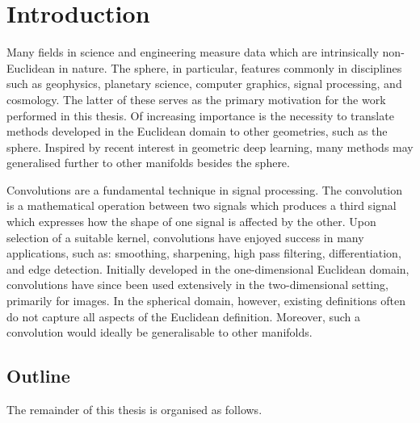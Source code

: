 \chapter{Introduction}\label{sec:chapter1}

Many fields in science and engineering measure data which are intrinsically non-Euclidean in nature.
The sphere, in particular, features commonly in disciplines such as geophysics, planetary science, computer graphics, signal processing, and cosmology.
The latter of these serves as the primary motivation for the work performed in this thesis.
Of increasing importance is the necessity to translate methods developed in the Euclidean domain to other geometries, such as the sphere.
Inspired by recent interest in geometric deep learning, many methods may generalised further to other manifolds besides the sphere.

Convolutions are a fundamental technique in signal processing.
The convolution is a mathematical operation between two signals which produces a third signal which expresses how the shape of one signal is affected by the other.
Upon selection of a suitable kernel, convolutions have enjoyed success in many applications, such as: smoothing, sharpening, high pass filtering, differentiation, and edge detection.
Initially developed in the one-dimensional Euclidean domain, convolutions have since been used extensively in the two-dimensional setting, primarily for images.
In the spherical domain, however, existing definitions often do not capture all aspects of the Euclidean definition.
Moreover, such a convolution would ideally be generalisable to other manifolds.

\section{Outline}

The remainder of this thesis is organised as follows.


